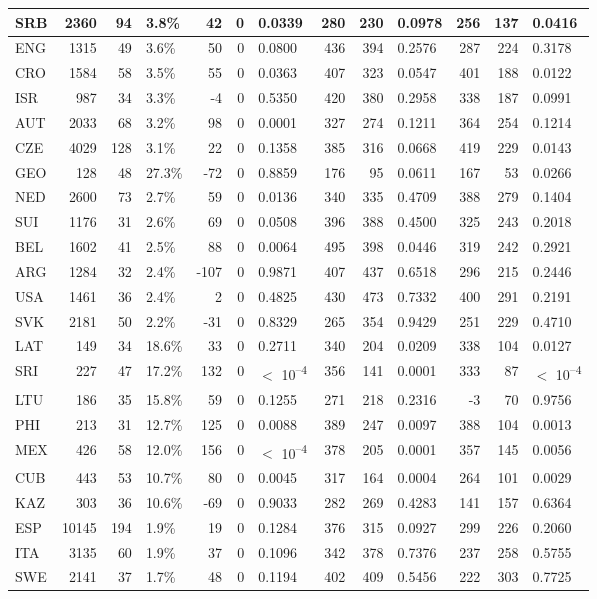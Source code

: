 \begin{tabular}{l|r|r|l|r|r|l|r|r|l|r|r|l}
\hline
SRB & 2360 & 94 & 3.8\% & 42 & 0 & 0.0339 & 280 & 230 & 0.0978 & 256 & 137 & 0.0416\\
\hline
ENG & 1315 & 49 & 3.6\% & 50 & 0 & 0.0800 & 436 & 394 & 0.2576 & 287 & 224 & 0.3178\\
\hline
CRO & 1584 & 58 & 3.5\% & 55 & 0 & 0.0363 & 407 & 323 & 0.0547 & 401 & 188 & 0.0122\\
\hline
ISR & 987 & 34 & 3.3\% & -4 & 0 & 0.5350 & 420 & 380 & 0.2958 & 338 & 187 & 0.0991\\
\hline
AUT & 2033 & 68 & 3.2\% & 98 & 0 & 0.0001 & 327 & 274 & 0.1211 & 364 & 254 & 0.1214\\
\hline
CZE & 4029 & 128 & 3.1\% & 22 & 0 & 0.1358 & 385 & 316 & 0.0668 & 419 & 229 & 0.0143\\
\hline
GEO & 128 & 48 & 27.3\% & -72 & 0 & 0.8859 & 176 & 95 & 0.0611 & 167 & 53 & 0.0266\\
\hline
NED & 2600 & 73 & 2.7\% & 59 & 0 & 0.0136 & 340 & 335 & 0.4709 & 388 & 279 & 0.1404\\
\hline
SUI & 1176 & 31 & 2.6\% & 69 & 0 & 0.0508 & 396 & 388 & 0.4500 & 325 & 243 & 0.2018\\
\hline
BEL & 1602 & 41 & 2.5\% & 88 & 0 & 0.0064 & 495 & 398 & 0.0446 & 319 & 242 & 0.2921\\
\hline
ARG & 1284 & 32 & 2.4\% & -107 & 0 & 0.9871 & 407 & 437 & 0.6518 & 296 & 215 & 0.2446\\
\hline
USA & 1461 & 36 & 2.4\% & 2 & 0 & 0.4825 & 430 & 473 & 0.7332 & 400 & 291 & 0.2191\\
\hline
SVK & 2181 & 50 & 2.2\% & -31 & 0 & 0.8329 & 265 & 354 & 0.9429 & 251 & 229 & 0.4710\\
\hline
LAT & 149 & 34 & 18.6\% & 33 & 0 & 0.2711 & 340 & 204 & 0.0209 & 338 & 104 & 0.0127\\
\hline
SRI & 227 & 47 & 17.2\% & 132 & 0 & $<$ 10\textsuperscript{--4} & 356 & 141 & 0.0001 & 333 & 87 & $<$ 10\textsuperscript{--4}\\
\hline
LTU & 186 & 35 & 15.8\% & 59 & 0 & 0.1255 & 271 & 218 & 0.2316 & -3 & 70 & 0.9756\\
\hline
PHI & 213 & 31 & 12.7\% & 125 & 0 & 0.0088 & 389 & 247 & 0.0097 & 388 & 104 & 0.0013\\
\hline
MEX & 426 & 58 & 12.0\% & 156 & 0 & $<$ 10\textsuperscript{--4} & 378 & 205 & 0.0001 & 357 & 145 & 0.0056\\
\hline
CUB & 443 & 53 & 10.7\% & 80 & 0 & 0.0045 & 317 & 164 & 0.0004 & 264 & 101 & 0.0029\\
\hline
KAZ & 303 & 36 & 10.6\% & -69 & 0 & 0.9033 & 282 & 269 & 0.4283 & 141 & 157 & 0.6364\\
\hline
ESP & 10145 & 194 & 1.9\% & 19 & 0 & 0.1284 & 376 & 315 & 0.0927 & 299 & 226 & 0.2060\\
\hline
ITA & 3135 & 60 & 1.9\% & 37 & 0 & 0.1096 & 342 & 378 & 0.7376 & 237 & 258 & 0.5755\\
\hline
SWE & 2141 & 37 & 1.7\% & 48 & 0 & 0.1194 & 402 & 409 & 0.5456 & 222 & 303 & 0.7725\\
\hline
\end{tabular}
